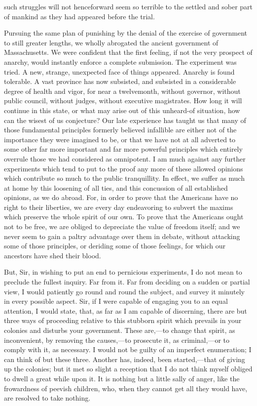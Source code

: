 such struggles will not henceforward seem so terrible to the settled and sober part of mankind as they had appeared before the trial.

Pursuing the same plan of punishing by the denial of the exercise of government to still greater lengths, we wholly abrogated the ancient government of Massachusetts. We were confident that the first feeling, if not the very prospect of anarchy, would instantly enforce a complete submission. The experiment was tried. A new, strange, unexpected face of things appeared. Anarchy is found tolerable. A vast province has now subsisted, and subsisted in a considerable degree of health and vigor, for near a twelvemonth, without governor, without public council, without judges, without executive magistrates. How long it will continue in this state, or what may arise out of this unheard-of situation, how can the wisest of us conjecture? Our late experience has taught us that many of those fundamental principles formerly believed infallible are either not of the importance they were imagined to be, or that we have not at all adverted to some other far more important and far more powerful principles which entirely overrule those we had considered as omnipotent. I am much against any further experiments which tend to put to the proof any more of these allowed opinions which contribute so much to the public tranquillity. In effect, we suffer as much at home by this loosening of all ties, and this concussion of all established opinions, as we do abroad. For, in order to prove that the Americans have no right to their liberties, we are every day endeavoring to subvert the maxims which preserve the whole spirit of our own. To prove that the Americans ought not to be free, we are obliged to depreciate the value of freedom itself; and we never seem to gain a paltry advantage over them in debate, without attacking some of those principles, or deriding some of those feelings, for which our ancestors have shed their blood.

But, Sir, in wishing to put an end to pernicious experiments, I do not mean to preclude the fullest inquiry. Far from it. Far from deciding on a sudden or partial view, I would patiently go round and round the subject, and survey it minutely in every possible aspect. Sir, if I were capable of engaging you to an equal attention, I would state, that, as far as I am capable of discerning, there are but three ways of proceeding relative to this stubborn spirit which prevails in your colonies and disturbs your government. These are,—to change that spirit, as inconvenient, by removing the causes,—to prosecute it, as criminal,—or to comply with it, as necessary. I would not be guilty of an imperfect enumeration; I can think of but these three. Another has, indeed, been started,—that of giving up the colonies; but it met so slight a reception that I do not think myself obliged to dwell a great while upon it. It is nothing but a little sally of anger, like the frowardness of peevish children, who, when they cannot get all they would have, are resolved to take nothing.

